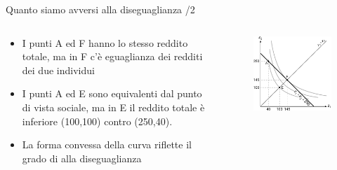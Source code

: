 \documentclass[aspectratio=64,11pt]{beamer}
\begin{document}
\begin{frame}{Quanto siamo avversi alla diseguaglianza /2}
\begin{columns}
\begin{column}{.5\columnwidth}
\begin{itemize}
\item I punti A ed F hanno lo stesso reddito totale, ma in F c'è eguaglianza dei
redditi dei due individui
\item I punti A ed E sono equivalenti dal punto di vista sociale, ma in E il
reddito totale è inferiore (100,100) contro (250,40).
\item La forma convessa della curva riflette il grado di alla diseguaglianza
\end{itemize}
\end{column}

\begin{column}{.5\columnwidth}
\begin{figure}[htbp]
\centering
\includegraphics[width=\textwidth]{./figure/fbs-4.pdf}
\end{figure}
\end{column}
\end{columns}
\end{frame}
\end{document}
